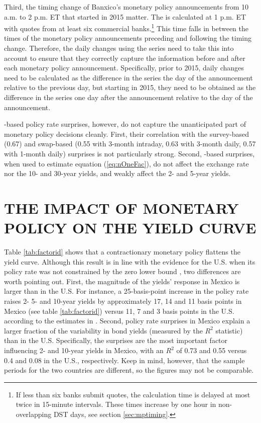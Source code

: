 \documentclass[a4paper,12pt]{article} 		%
\begin{document}
\begin{appendices}
Third, the timing change of Banxico's monetary policy announcements from 10 a.m. to 2 p.m. ET that started in 2015 matter. The \tiie{} is calculated at 1 p.m. ET with quotes from at least six commercial banks.\footnote{ If less than six banks submit quotes, the calculation time is delayed at most twice in 15-minute intervals. These times increase by one hour in non-overlapping DST days, see section \ref{sec:mptiming}.} This time falls in between the times of the monetary policy announcements preceding and following the timing change. Therefore, the daily changes using the \tiie{} series need to take this into account to ensure that they correctly capture the information before and after each monetary policy announcement. Specifically, prior to 2015, daily changes need to be calculated as the difference in the series the day of the announcement relative to the previous day, but starting in 2015, they need to be obtained as the difference in the series one day after the announcement relative to the day of the announcement.

\tiie{}-based policy rate surprises, however, do not capture the unanticipated part of monetary policy decisions cleanly. First, their correlation with the survey-based (0.67) and swap-based (0.55 with 3-month intraday, 0.63 with 3-month daily, 0.57 with 1-month daily) surprises is not particularly strong. 
Second, \tiie{}-based surprises, when used to estimate equation (\ref{eq:nOneFac}), do not affect the exchange rate nor the 10- and 30-year yields, and weakly affect the 2- and 5-year yields. 

\sectitlespace
\section{THE IMPACT OF MONETARY POLICY ON THE YIELD CURVE} \label{sec:yieldcurve}
\sectitlespace

Table \ref{tab:factorid} shows that a contractionary monetary policy flattens the yield curve. Although this result is in line with the evidence for the U.S. when its policy rate was not constrained by the zero lower bound \parencite{Kuttner:2001, GSS:2005a}, two differences are worth pointing out. First, the magnitude of the yields' response in Mexico is larger than in the U.S. For instance, a 25-basis-point increase in the policy rate raises 2- 5- and 10-year yields by approximately 17, 14 and 11 basis points in Mexico (see table \ref{tab:factorid}) versus 11, 7 and 3 basis points in the U.S. according to the estimates in \textcite{GSS:2005a}. Second, policy rate surprises in Mexico explain a larger fraction of the variability in bond yields (measured by the \(R^2\) statistic) than in the U.S. Specifically, the surprises are the most important factor influencing 2- and 10-year yields in Mexico, with an \(R^2\) of 0.73 and 0.55 versus 0.4 and 0.08 in the U.S., respectively. Keep in mind, however, that the sample periods for the two countries are different, so the figures may not be comparable.


\end{appendices}
\end{document}
